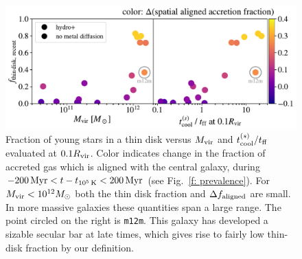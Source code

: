 \documentclass[fleqn,usenatbib]{mnras}
\newcommand{\tcools}{t_{10^5\,{\rm K}}}
\begin{document}
\begin{figure}
    \centering
    \includegraphics[width=\textwidth]{figures/prevalence/aligned_fraction_vs_galaxy_props.pdf}
    \caption{
    Fraction of young stars in a thin disk versus $M_{\rm vir}$ and $t_{\rm cool}^{(s)}/t_{\rm ff}$ evaluated at $0.1 R_{\rm vir}$.
    Color indicates change in the fraction of accreted gas which is aligned with the central galaxy, during $-200\,{\rm Myr} < t-\tcools < 200\,{\rm Myr}$ (see Fig.~\ref{f: prevalence}).
    For $M_{\rm vir} < 10^{12} M_\odot$ both the thin disk fraction and $\Delta f_{\rm aligned}$ are small.
    In more massive galaxies these quantities span a large range.
    The point circled on the right is \texttt{m12m}.
    This galaxy has developed a sizable secular bar at late times, which gives rise to fairly low thin-disk fraction by our definition. 
    }
    \label{f: prevalence vs galaxy properties}
\end{figure}

\newcommand{\tcoolsh}{t_{\rm cool}^{(s)}}
\newcommand{\tff}{t_{\rm ff}}
\newcommand{\Mvir}{M_{\rm vir}}
\end{document}
